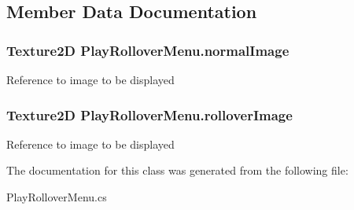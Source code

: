 \subsection{Member Data Documentation}
\hypertarget{class_play_rollover_menu_a291ee960efe64e860a910579971d7f79}{
\subsubsection[{normal\-Image}]{\setlength{\rightskip}{0pt plus 5cm}Texture2\-D Play\-Rollover\-Menu.\-normal\-Image}}\label{class_play_rollover_menu_a291ee960efe64e860a910579971d7f79}
Reference to image to be displayed \hypertarget{class_play_rollover_menu_aa523c3e0465efefc82043c174cbf7a66}{
\subsubsection[{rollover\-Image}]{\setlength{\rightskip}{0pt plus 5cm}Texture2\-D Play\-Rollover\-Menu.\-rollover\-Image}}\label{class_play_rollover_menu_aa523c3e0465efefc82043c174cbf7a66}
Reference to image to be displayed 

The documentation for this class was generated from the following file\-:\begin{DoxyCompactItemize}
\item 
Play\-Rollover\-Menu.\-cs\end{DoxyCompactItemize}
